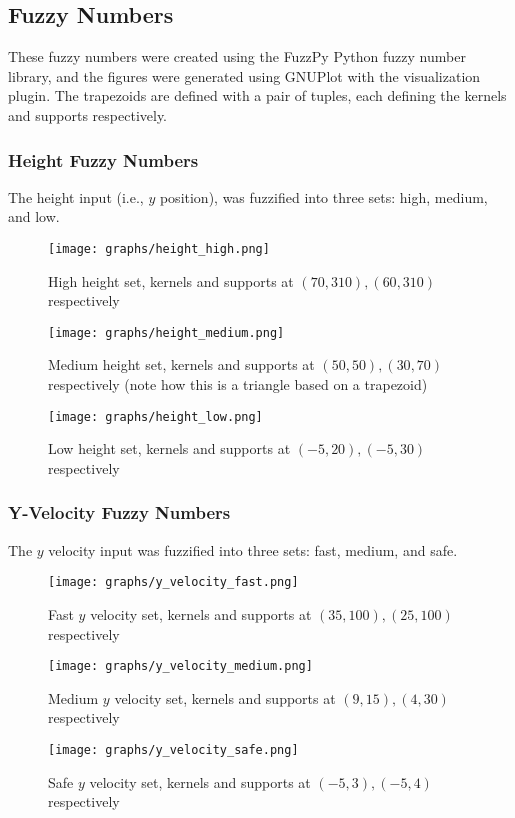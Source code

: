 \documentclass[12pt, article]{scrartcl}
\begin{document}
\subsection{Fuzzy Numbers}
These fuzzy numbers were created using the FuzzPy Python fuzzy number library, and the figures were generated using GNUPlot with the visualization plugin. The trapezoids are defined with a pair of tuples, each defining the kernels and supports respectively.

\subsubsection{Height Fuzzy Numbers}
The height input (i.e., $y$ position), was fuzzified into three sets: high, medium, and low.
\begin{figure}[h]
    \centering
    \caption{High height set, kernels and supports at $(70, 310), (60, 310)$ respectively}
    \texttt{[image: graphs/height\_high.png]}
\end{figure}
\begin{figure}[h]
    \centering
    \caption{Medium height set, kernels and supports at $(50, 50), (30, 70)$ respectively (note how this is a triangle based on a trapezoid)}
    \texttt{[image: graphs/height\_medium.png]}
\end{figure}
\begin{figure}[h]
    \centering
    \caption{Low height set, kernels and supports at $(-5, 20), (-5, 30)$ respectively}
    \texttt{[image: graphs/height\_low.png]}
\end{figure}

\subsubsection{Y-Velocity Fuzzy Numbers}
The $y$ velocity input was fuzzified into three sets: fast, medium, and safe.
\begin{figure}[h]
    \centering
    \caption{Fast $y$ velocity set, kernels and supports at $(35, 100), (25, 100)$ respectively}
    \texttt{[image: graphs/y\_velocity\_fast.png]}
\end{figure}
\begin{figure}[h]
    \centering
    \caption{Medium $y$ velocity set, kernels and supports at $(9, 15), (4, 30)$ respectively}
    \texttt{[image: graphs/y\_velocity\_medium.png]}
\end{figure}
\begin{figure}[h]
    \centering
    \caption{Safe $y$ velocity set, kernels and supports at $(-5, 3), (-5, 4)$ respectively}
    \texttt{[image: graphs/y\_velocity\_safe.png]}
\end{figure}
\end{document}
